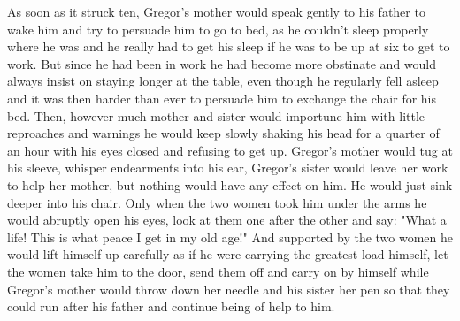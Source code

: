 As soon as it struck ten, Gregor's mother would speak gently to his father to wake him and try to persuade him to go to bed, as he couldn't sleep properly where he was and he really had to get his sleep if he was to be up at six to get to work. But since he had been in work he had become more obstinate and would always insist on staying longer at the table, even though he regularly fell asleep and it was then harder than ever to persuade him to exchange the chair for his bed. Then, however much mother and sister would importune him with little reproaches and warnings he would keep slowly shaking his head for a quarter of an hour with his eyes closed and refusing to get up. Gregor's mother would tug at his sleeve, whisper endearments into his ear, Gregor's sister would leave her work to help her mother, but nothing would have any effect on him. He would just sink deeper into his chair. Only when the two women took him under the arms he would abruptly open his eyes, look at them one after the other and say: "What a life! This is what peace I get in my old age!" And supported by the two women he would lift himself up carefully as if he were carrying the greatest load himself, let the women take him to the door, send them off and carry on by himself while Gregor's mother would throw down her needle and his sister her pen so that they could run after his father and continue being of help to him.

